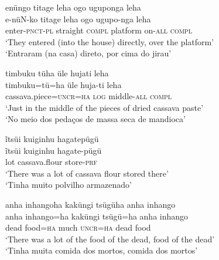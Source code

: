 \documentclass[output=paper,
modfonts,nonflat
]{langsci/langscibook}
\begin{document}
\ea enüngo titage leha ogo{\footnotemark} uguponga leha \\[.3em]
\gll e-nüN-ko titage leha ogo ugupo-nga leha \\
enter-\textsc{pnct-pl} straight \textsc{compl} platform on-\textsc{all} \textsc{compl} \\
\glt ‘They entered (into the house) directly, over the platform’ \\
‘Entraram (na casa) direto, por cima do jirau’ \\
\z

\ea timbuku{\footnotemark} tüha üle hujati leha \\[.3em]
\gll timbuku=tü=ha 	üle	huja-ti 		leha \\
cassava.piece=\textsc{uncr}=\textsc{ha} 	\textsc{log}	middle-\textsc{all} 	\textsc{compl} \\
\glt ‘Just in the middle of the pieces of dried cassava paste’ \\
‘No meio dos pedaços de massa seca de mandioca’ \\
\z

\ea ĩtsüi kuiginhu{\footnotemark} hagatepügü \\[.3em]
\gll ĩtsüi	kuiginhu	hagate-pügü \\
lot 	cassava.flour 	store-\textsc{prf} \\
\glt ‘There was a lot of cassava flour stored there’ \\
‘Tinha muito polvilho armazenado’ \\
\z

\ea anha inhangoha kaküngi tsügüha anha inhango \\[.3em]
\gll anha	inhango=ha	kaküngi	tsügü=ha	anha	inhango \\
dead 	food=\textsc{ha} 	much 		\textsc{uncr=ha} 	dead 	food \\
\glt ‘There was a lot of the food of the dead, food of the dead’ \\
‘Tinha muita comida dos mortos, comida dos mortos’ \\
\z
\end{document}
